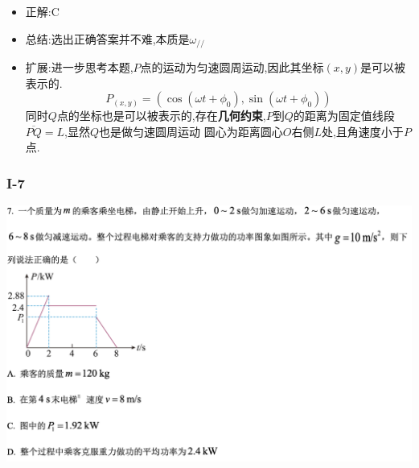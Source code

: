 \documentclass{article}
\begin{document}
    \begin{itemize}
        \item 正解:\quad C
        \item 总结:\quad 选出正确答案并不难,本质是$\omega_{//}$
        \item 扩展:\quad 进一步思考本题,$P$点的运动为匀速圆周运动,因此其坐标$(x,y)$是可以被表示的.
                  $$
                  P_(x,y) = (\cos{(\omega t + \phi_{0})} , \sin{(\omega t + \phi_{0})})
                  $$
                  同时$Q$点的坐标也是可以被表示的,存在\textbf{几何约束},$P$到$Q$的距离为固定值线段$\overline{PQ} = L$,显然$Q$也是做匀速圆周运动
                  圆心为距离圆心$O$右侧$L$处,且角速度小于$P$点.
    \end{itemize}
 
    \subsubsection{I-7}
    \includegraphics[width=50em,keepaspectratio]{./pictures/1.2-2.png}
\end{document}
